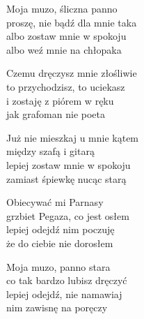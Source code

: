 \begin{text}
    Moja muzo, śliczna panno\\
    proszę, nie bądź dla mnie taka\\
    albo zostaw mnie w spokoju\\
    albo weź mnie na chłopaka

    Czemu dręczysz mnie złośliwie\\
    to przychodzisz, to uciekasz\\
    i zostaję z piórem w ręku\\
    jak grafoman nie poeta

    Już nie mieszkaj u mnie kątem\\
    między szafą i gitarą\\
    lepiej zostaw mnie w spokoju\\
    zamiast śpiewkę nucąc starą

    Obiecywać mi Parnasy\\
    grzbiet Pegaza, co jest osłem\\
    lepiej odejdź nim poczuję\\
    że do ciebie nie dorosłem

    Moja muzo, panno stara\\
    co tak bardzo lubisz dręczyć\\
    lepiej odejdź, nie namawiaj\\
    nim zawisnę na poręczy
\end{text}
\begin{chord}

\end{chord}